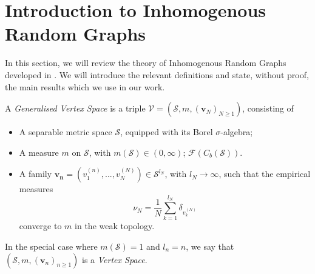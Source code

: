 
\section{Introduction to Inhomogenous Random Graphs}
In this section, we will review the theory of Inhomogenous Random Graphs developed in \cite{BJR07}. We will introduce the relevant definitions and state, without proof, the main results which we use in our work.
\begin{definition} A \emph{Generalised Vertex Space} is a triple $\mathcal{V}=(\mathcal{S}, m, (\mathbf{v}_N)_{N\geq 1})$, consisting of \begin{itemize}
    \item A separable metric space $\mathcal{S}$, equipped with its Borel $\sigma$-algebra;
    \item A measure $m$ on $\mathcal{S}$, with $m(\mathcal{S}) \in (0, \infty)$; $\mathcal{F}(C_b(\mathcal{S})).$
    \item A family $\mathbf{v_n}=(v^{(n)}_1,...,v^{(N)}_N) \in \mathcal{S}^{l_N}$, with $l_N\rightarrow \infty$,  such that the empirical measures \begin{equation}
        \nu_N=\frac{1}{N}\sum_{k=1}^{l_N} \delta_{v^{(N)}_k} \end{equation} converge to $m$ in the weak topology.

\end{itemize} In the special case where $m(\mathcal{S})=1$ and $l_n=n$, we say that $(\mathcal{S}, m, (\mathbf{v}_n)_{n\geq 1})$ is a \emph{Vertex Space}. \end{definition}  
